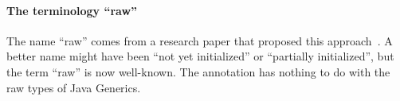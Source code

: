 \paragraph{The terminology ``raw''\label{rawness-checking-terminology-raw}}

The name ``raw'' comes from a research paper that proposed this
approach~\cite{FahndrichL2003}.
A better name might have been ``not yet initialized'' or ``partially
initialized'', but the term ``raw'' is now well-known.
The 
annotation has nothing to do with the raw types of Java Generics.


